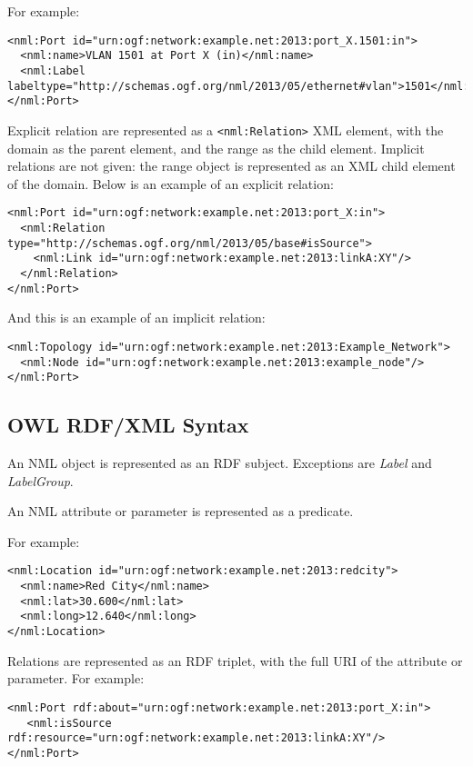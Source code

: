 For example:
\begin{lstlisting}
<nml:Port id="urn:ogf:network:example.net:2013:port_X.1501:in">
  <nml:name>VLAN 1501 at Port X (in)</nml:name>
  <nml:Label labeltype="http://schemas.ogf.org/nml/2013/05/ethernet#vlan">1501</nml:Label>
</nml:Port>
\end{lstlisting}

Explicit relation are represented as a \texttt{<nml:Relation>} XML element, with the domain as the parent element, and the range as the child element. Implicit relations are not given: the range object is represented as an XML child element of the domain. 
Below is an example of an explicit relation:
\begin{lstlisting}
<nml:Port id="urn:ogf:network:example.net:2013:port_X:in">
  <nml:Relation type="http://schemas.ogf.org/nml/2013/05/base#isSource">
    <nml:Link id="urn:ogf:network:example.net:2013:linkA:XY"/>
  </nml:Relation>
</nml:Port>
\end{lstlisting}
And this is an example of an implicit relation:
\begin{lstlisting}
<nml:Topology id="urn:ogf:network:example.net:2013:Example_Network">
  <nml:Node id="urn:ogf:network:example.net:2013:example_node"/>
</nml:Port>
\end{lstlisting}





\subsection{OWL RDF/XML Syntax} %
\label{sub:owl}

An NML object is represented as an RDF subject. Exceptions are \emph{Label} and \emph{LabelGroup}.

An NML attribute or parameter is represented as a predicate. 

For example:
\begin{lstlisting}
<nml:Location id="urn:ogf:network:example.net:2013:redcity">
  <nml:name>Red City</nml:name>
  <nml:lat>30.600</nml:lat>
  <nml:long>12.640</nml:long>
</nml:Location>
\end{lstlisting}

Relations are represented as an RDF triplet, with the full URI of the attribute or parameter.  For example:
\begin{lstlisting}
<nml:Port rdf:about="urn:ogf:network:example.net:2013:port_X:in">
   <nml:isSource rdf:resource="urn:ogf:network:example.net:2013:linkA:XY"/>
</nml:Port>
\end{lstlisting}

